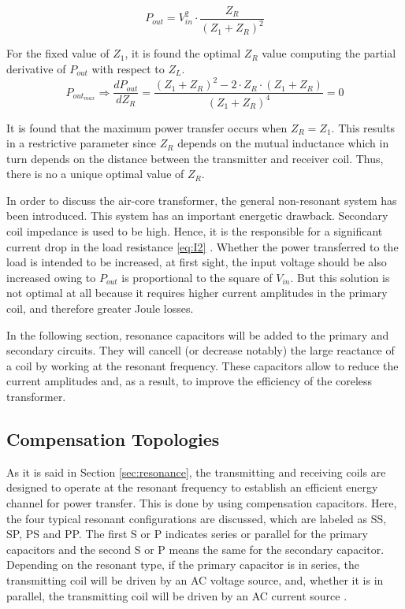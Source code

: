 \begin{equation}
	P_{out} = V_{in}^2\cdot\frac{Z_R}{(Z_1+Z_R)^2}
\end{equation}

For the fixed value of $Z_1$, it is found the optimal $Z_R$ value computing the partial derivative of $P_{out}$ with respect to $Z_L$.
\begin{equation}
	P_{out_{max}}\Rightarrow\frac{dP_{out}}{dZ_R}=\frac{(Z_1+Z_R)^2-2\cdot{Z_R}\cdot(Z_1+Z_R)}{(Z_1+Z_R)^4}=0
\end{equation}

It is found that the maximum power transfer occurs when $Z_R=Z_1$. This results in a restrictive parameter since $Z_R$ depends on the mutual inductance which in turn depends on the distance between the transmitter and receiver coil. Thus, there is no a unique optimal value of $Z_R$. 

In order to discuss the air-core transformer, the general non-resonant system has been introduced. This system has an important energetic drawback. Secondary coil impedance is used to be high. Hence, it is the responsible for a significant current drop in the load resistance \ref{eq:I2} \cite{meyer}. Whether the power transferred to the load is intended to be increased, at first sight, the input voltage should be also increased owing to $P_{out}$ is proportional to the square of $V_{in}$. But this solution is not optimal at all because it requires higher current amplitudes in the primary coil, and therefore greater Joule losses.

In the following section, resonance capacitors will be added to the primary and secondary circuits. They will cancell (or decrease notably) the large reactance of a coil by working at the resonant frequency. These capacitors allow to reduce the current amplitudes and, as a result, to improve the efficiency of the coreless transformer. 




\subsection{Compensation Topologies}
As it is said in Section \ref{sec:resonance}, the transmitting and receiving coils are designed to operate at the resonant frequency to establish an efficient energy channel for power transfer. This is done by using compensation capacitors. Here, the four typical resonant configurations are discussed, which are labeled as SS, SP, PS and PP. The first S or P indicates series or parallel for the primary capacitors and the second S or P means the same for the secondary capacitor. Depending on the resonant type, if the primary capacitor is in series, the transmitting coil will be driven by an AC voltage source, and, whether it is in parallel, the transmitting coil will be driven by an AC current source \cite{matrizNegativa}.

